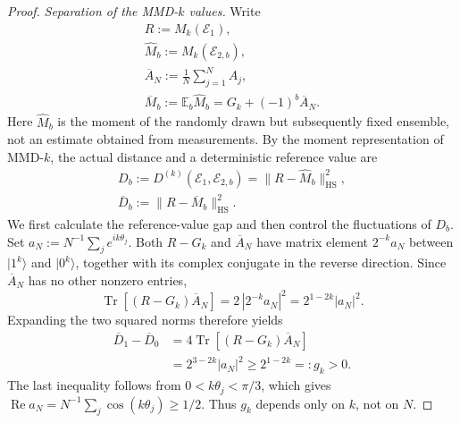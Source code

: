 \documentclass[aps,prx,reprint,superscriptaddress,amsmath,amssymb,longbibliography,floatfix]{revtex4-2}
\theoremstyle{plain}
\theoremstyle{definition}
\theoremstyle{remark}
\begin{document}
\begin{proof}
\emph{Separation of the MMD-$k$ values.} Write
\[
\begin{gathered}
R:=M_k(\mathcal E_1),\\ \widehat M_b:=M_k(\mathcal E_{2,b}),\\ \overline A_N:=\frac1N\sum_{j=1}^NA_j,\\ \overline M_b:=\mathbb E_b\widehat M_b=G_k+(-1)^b\overline A_N.
\end{gathered}
\]
Here $\widehat M_b$ is the moment of the randomly drawn but subsequently fixed ensemble, not an estimate obtained from measurements. By the moment representation of MMD-$k$, the actual distance and a deterministic reference value are
\begin{equation}
\begin{gathered}
D_b:=D^{(k)}(\mathcal E_1,\mathcal E_{2,b})=\|R-\widehat M_b\|_{\mathrm{HS}}^2,\\ \overline D_b:=\|R-\overline M_b\|_{\mathrm{HS}}^2.
\end{gathered}
\label{eq:app-mmd-lower-reference-distances}
\end{equation}
We first calculate the reference-value gap and then control the fluctuations of $D_b$. Set $a_N:=N^{-1}\sum_j e^{ik\theta_j}$. Both $R-G_k$ and $\overline A_N$ have matrix element $2^{-k}a_N$ between $|1^k\rangle$ and $|0^k\rangle$, together with its complex conjugate in the reverse direction. Since $\overline A_N$ has no other nonzero entries,
\[
\operatorname{Tr}[(R-G_k)\overline A_N]=2\,|2^{-k}a_N|^2=2^{1-2k}|a_N|^2.
\]
Expanding the two squared norms therefore yields
\begin{equation}
\begin{aligned}
\overline D_1-\overline D_0&=4\operatorname{Tr}[(R-G_k)\overline A_N]\\
&=2^{3-2k}|a_N|^2\ge2^{1-2k}=:g_k>0.
\end{aligned}
\label{eq:app-mmd-lower-reference-gap}
\end{equation}
The last inequality follows from $0<k\theta_j<\pi/3$, which gives $\operatorname{Re}a_N=N^{-1}\sum_j\cos(k\theta_j)\ge1/2$. Thus $g_k$ depends only on $k$, not on $N$.


\end{proof}
\end{document}
